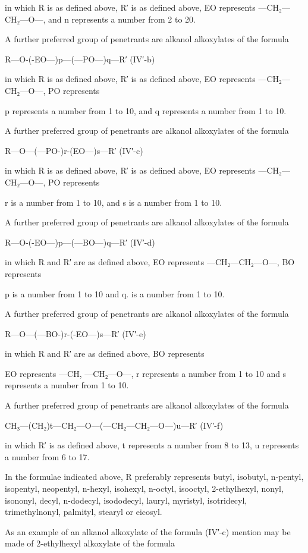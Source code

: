 \documentclass[11pt,a4paper]{article}
\begin{document}
in which R is as defined above, R′ is as defined above, EO represents —CH₂—CH₂—O—, and n represents a number from 2 to 20.

A further preferred group of penetrants are alkanol alkoxylates of the formula

R—O-(-EO—)p—(—PO—)q—R′ (IV′-b)

in which R is as defined above, R′ is as defined above, EO represents —CH₂—CH₂—O—, PO represents

p represents a number from 1 to 10, and q represents a number from 1 to 10.

A further preferred group of penetrants are alkanol alkoxylates of the formula

R—O—(—PO-)r-(EO—)s—R′ (IV′-c)

in which R is as defined above, R′ is as defined above, EO represents —CH₂—CH₂—O—, PO represents

r is a number from 1 to 10, and s is a number from 1 to 10.

A further preferred group of penetrants are alkanol alkoxylates of the formula

R—O-(-EO—)p—(—BO—)q—R′ (IV′-d)

in which R and R′ are as defined above, EO represents —CH₂—CH₂—O—, BO represents

p is a number from 1 to 10 and q. is a number from 1 to 10.

A further preferred group of penetrants are alkanol alkoxylates of the formula

R—O—(—BO-)r-(-EO—)s—R′ (IV′-e)

in which R and R′ are as defined above, BO represents

EO represents —CH, —CH₂—O—, r represents a number from 1 to 10 and s represents a number from 1 to 10.

A further preferred group of penetrants are alkanol alkoxylates of the formula

CH₃—(CH₂)t—CH₂—O—(—CH₂—CH₂—O—)u—R′ (IV′-f)

in which R′ is as defined above, t represents a number from 8 to 13, u represents a number from 6 to 17.

In the formulae indicated above, R preferably represents butyl, isobutyl, n-pentyl, isopentyl, neopentyl, n-hexyl, isohexyl, n-octyl, isooctyl, 2-ethylhexyl, nonyl, isononyl, decyl, n-dodecyl, isododecyl, lauryl, myristyl, isotridecyl, trimethylnonyl, palmityl, stearyl or eicosyl.

As an example of an alkanol alkoxylate of the formula (IV′-c) mention may be made of 2-ethylhexyl alkoxylate of the formula
\end{document}
